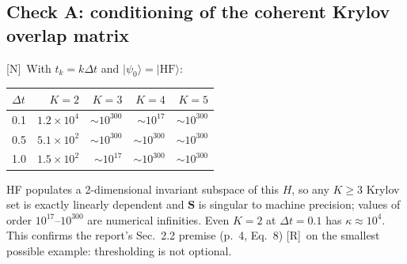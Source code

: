 \documentclass[11pt,a4paper]{article}
\newcommand{\ket}[1]{\lvert #1\rangle}
\newcommand{\report}{the report}
\newcommand{\lR}{\textcolor{keyblue}{[R]}}   %
\newcommand{\lN}{\textcolor{keyblue}{[N]}}   %
\begin{document}
\subsection{Check A: conditioning of the coherent Krylov overlap matrix}
\lN\ With $t_k=k\Delta t$ and $\ket{\psi_0}=\ket{\mathrm{HF}}$:
\begin{center}\small
\begin{tabular}{@{}lrrrr@{}}
\toprule
$\Delta t$ & $K=2$ & $K=3$ & $K=4$ & $K=5$\\\midrule
0.1 & $1.2\times10^{4}$ & $\sim10^{300}$ & $\sim10^{17}$ & $\sim10^{300}$\\
0.5 & $5.1\times10^{2}$ & $\sim10^{300}$ & $\sim10^{300}$ & $\sim10^{300}$\\
1.0 & $1.5\times10^{2}$ & $\sim10^{17}$ & $\sim10^{300}$ & $\sim10^{300}$\\
\bottomrule
\end{tabular}
\end{center}
HF populates a 2-dimensional invariant subspace of this $H$, so any $K\ge3$ Krylov set is exactly linearly dependent and $\mathbf S$ is singular to machine precision; values of order $10^{17}$--$10^{300}$ are numerical infinities. Even $K=2$ at $\Delta t=0.1$ has $\kappa\approx10^4$. This confirms \report's Sec.~2.2 premise (p.~4, Eq.~8) \lR\ on the smallest possible example: thresholding is not optional.
\end{document}
